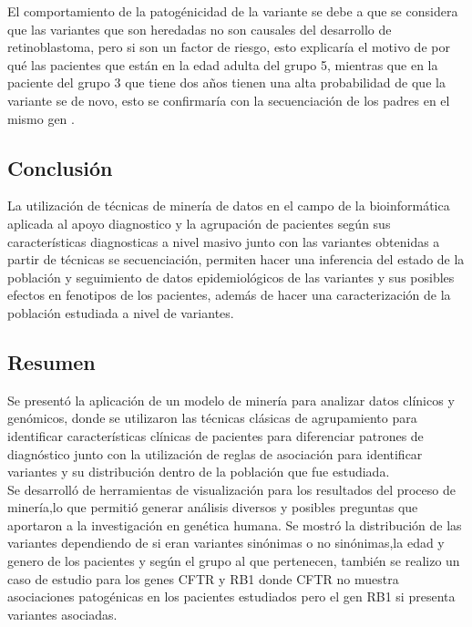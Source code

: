 El comportamiento de la patogénicidad de la variante se debe a que se considera que las variantes que son heredadas no son causales del desarrollo de retinoblastoma, pero si son un factor de riesgo, esto explicaría el motivo de por qué  las pacientes que están en la edad adulta del grupo 5, mientras que en la paciente del grupo 3 que tiene dos años tienen una alta probabilidad de que la variante se de novo, esto se confirmaría con la secuenciación de los padres en el mismo gen \cite{Parma2017}. \\

\subsection{Conclusión}

La utilización de técnicas de minería de datos en el campo de la bioinformática aplicada al apoyo diagnostico y  la agrupación de pacientes según sus características diagnosticas a nivel masivo junto con las variantes obtenidas a partir de técnicas se secuenciación, permiten hacer una inferencia del estado de la población y seguimiento de datos epidemiológicos de las variantes y sus posibles efectos en fenotipos de los pacientes, además de hacer una caracterización de la población estudiada a nivel de variantes.


\subsection*{Resumen}

Se presentó la aplicación de un modelo de minería para analizar datos clínicos y genómicos, donde se utilizaron las técnicas clásicas de  agrupamiento para identificar características clínicas de pacientes para diferenciar patrones de diagnóstico junto con la utilización de reglas de asociación para identificar variantes y su distribución dentro de la población que fue estudiada.\\

Se desarrolló de herramientas de visualización para los resultados del proceso de minería,lo que permitió generar análisis diversos y posibles preguntas que aportaron a la investigación en genética humana. Se mostró la distribución de las variantes dependiendo de si eran variantes sinónimas o no sinónimas,la edad y genero de los pacientes y según el grupo al que pertenecen, también se realizo un caso de estudio para los genes CFTR y RB1 donde CFTR no muestra asociaciones patogénicas en los pacientes estudiados pero el gen RB1 si presenta variantes asociadas.




   
